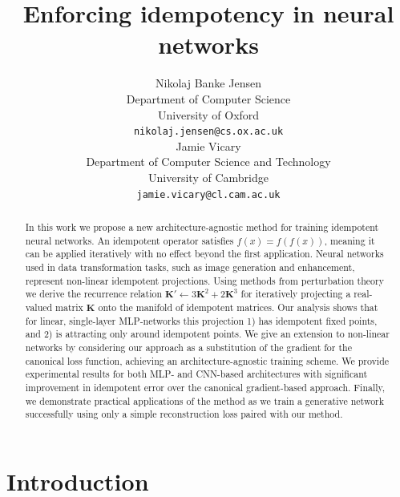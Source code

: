 \documentclass{article}
\title{Enforcing idempotency in neural networks}
\author{%
  Nikolaj Banke Jensen \\ %
  Department of Computer Science\\
  University of Oxford\\
  \texttt{nikolaj.jensen@cs.ox.ac.uk} \\
  \And
  Jamie Vicary \\
  Department of Computer Science and Technology \\
  University of Cambridge \\
  \texttt{jamie.vicary@cl.cam.ac.uk} \\
}
\newcommand{\vK}{\mathbf{K}}
\begin{document}
\maketitle


\begin{abstract}
  In this work we propose a new architecture-agnostic method for training idempotent neural networks. An idempotent operator satisfies $f(x) = f(f(x))$, meaning it can be applied iteratively with no effect beyond the first application. Neural networks used in data transformation tasks, such as image generation and enhancement, represent non-linear idempotent projections. Using methods from perturbation theory we derive the recurrence relation ${\vK' \leftarrow 3\vK^2 + 2\vK^3}$ for iteratively projecting a real-valued matrix $\vK$ onto the manifold of idempotent matrices. Our analysis shows that for linear, single-layer MLP-networks this projection 1) has idempotent fixed points, and 2) is attracting only around idempotent points. We give an extension to non-linear networks by considering our approach as a substitution of the gradient for the canonical loss function, achieving an architecture-agnostic training scheme. We provide experimental results for both MLP- and CNN-based architectures with significant improvement in idempotent error over the canonical gradient-based approach. Finally, we demonstrate practical applications of the method as we train a generative network successfully using only a simple reconstruction loss paired with our method.
\end{abstract}

\section{Introduction}
\label{sec:intro}
\end{document}
